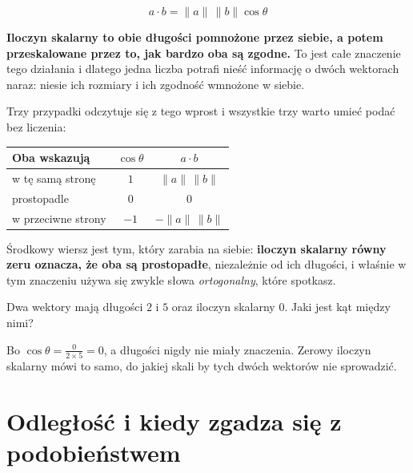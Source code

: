 \begin{fr}
\begin{ansblock}
\[ a \cdot b = \lVert a \rVert\, \lVert b \rVert \cos\theta \]
\end{ansblock}

\textbf{Iloczyn skalarny to obie długości pomnożone przez siebie, a potem
przeskalowane przez to, jak bardzo oba są zgodne.} To jest całe znaczenie tego
działania i dlatego jedna liczba potrafi nieść informację o dwóch wektorach
naraz: niesie ich rozmiary i ich zgodność wmnożone w siebie.

Trzy przypadki odczytuje się z tego wprost i wszystkie trzy warto umieć podać
bez liczenia:

\begin{center}
\begin{tabular}{lcc}
\toprule
Oba wskazują & $\cos\theta$ & $a \cdot b$ \\
\midrule
w tę samą stronę & $1$ & $\lVert a \rVert\, \lVert b \rVert$ \\
prostopadle & $0$ & $0$ \\
w przeciwne strony & $-1$ & $-\lVert a \rVert\, \lVert b \rVert$ \\
\bottomrule
\end{tabular}
\end{center}

Środkowy wiersz jest tym, który zarabia na siebie: \textbf{iloczyn skalarny
równy zeru oznacza, że oba są prostopadłe}, niezależnie od ich długości, i
właśnie w tym znaczeniu używa się zwykle słowa \emph{ortogonalny}, które
spotkasz.

Dwa wektory mają długości $2$ i $5$ oraz iloczyn skalarny $0$. Jaki jest kąt
między nimi?
\nextframe
\end{fr}

\begin{fr}
Bo $\cos\theta = \frac{0}{2 \times 5} = 0$, a długości nigdy nie miały
znaczenia. Zerowy iloczyn skalarny mówi to samo, do jakiej skali by tych dwóch
wektorów nie sprowadzić.
\end{fr}

\section{Odległość i kiedy zgadza się z podobieństwem}
\label{sec:F09-distance}

